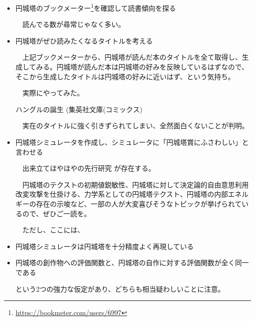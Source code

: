 \documentclass[10pt, a5paper, twoside]{jsarticle}
\theoremstyle{definition}
\begin{document}
		\begin{itemize}

			\item 円城塔のブックメーター\footnote{\url{https://bookmeter.com/users/6997}}を確認して読書傾向を探る

			\vspace{1mm}

			　読んでる数が尋常じゃなく多い。

			\vspace{2mm}

			\item 円城塔がぜひ読みたくなるタイトルを考える

			\vspace{1mm}

			　上記ブックメーターから、円城塔が読んだ本のタイトルを全て取得し、生成してみる。円城塔が読んだ本は円城塔の好みを反映しているはずなので、そこから生成したタイトルは円城塔の好みに近いはず、という気持ち。

			\vspace{2mm}

			　実際にやってみた。

			\begin{center}

				ハングルの誕生 (集英社文庫(コミックス)

			\end{center}

			　実在のタイトルに強く引きずられてしまい、全然面白くないことが判明。

			\vspace{2mm}

			\item 円城塔シミュレータを作成し、シミュレータに「円城塔賞にふさわしい」と言わせる

			\vspace{1mm}

			　出来立てほやほやの先行研究\cite{aki} が存在する。

			　円城塔のテクストの初期値鋭敏性、円城塔に対して決定論的自由意思利用改変攻撃を仕掛ける、力学系としての円城塔テクスト、円城塔の内部エネルギーの存在の示唆など、一部の人が大変喜びそうなトピックが挙げられているので、ぜひご一読を。

			　ただし、ここには、
　　　		
				\item 円城塔シミュレータは円城塔を十分精度よく再現している

				\item 円城塔の創作物への評価関数と、円城塔の自作に対する評価関数が全く同一である

			という2つの強力な仮定があり、どちらも相当疑わしいことに注意。

		\end{itemize}
\end{document}
